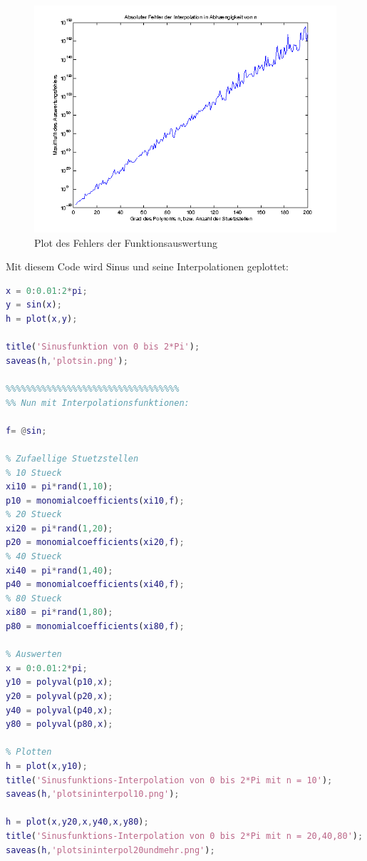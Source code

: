 \documentclass[11pt,a4paper,ngerman]{article}
\begin{document}
\begin{description}
\begin{figure}[h!]
\caption{Plot des Fehlers der Funktionsauswertung}
\includegraphics[width=\textwidth]{plotsinfehler.png}
\end{figure}

\pagebreak

Mit diesem Code wird Sinus und seine Interpolationen geplottet: \\

\begin{lstlisting}[language=matlab]
x = 0:0.01:2*pi;
y = sin(x);
h = plot(x,y);

title('Sinusfunktion von 0 bis 2*Pi');
saveas(h,'plotsin.png');

%%%%%%%%%%%%%%%%%%%%%%%%%%%%%%%%%%
%% Nun mit Interpolationsfunktionen:

f= @sin;

% Zufaellige Stuetzstellen
% 10 Stueck
xi10 = pi*rand(1,10);
p10 = monomialcoefficients(xi10,f);
% 20 Stueck
xi20 = pi*rand(1,20);
p20 = monomialcoefficients(xi20,f);
% 40 Stueck
xi40 = pi*rand(1,40);
p40 = monomialcoefficients(xi40,f);
% 80 Stueck
xi80 = pi*rand(1,80);
p80 = monomialcoefficients(xi80,f);

% Auswerten
x = 0:0.01:2*pi;
y10 = polyval(p10,x);
y20 = polyval(p20,x);
y40 = polyval(p40,x);
y80 = polyval(p80,x);

% Plotten
h = plot(x,y10);
title('Sinusfunktions-Interpolation von 0 bis 2*Pi mit n = 10');
saveas(h,'plotsininterpol10.png');

h = plot(x,y20,x,y40,x,y80);
title('Sinusfunktions-Interpolation von 0 bis 2*Pi mit n = 20,40,80');
saveas(h,'plotsininterpol20undmehr.png');
\end{lstlisting}


\end{description}
\end{document}
